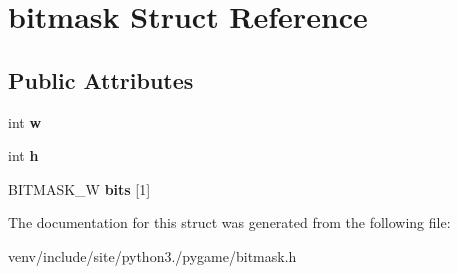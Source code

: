 \hypertarget{structbitmask}{}\section{bitmask Struct Reference}
\label{structbitmask}
\subsection*{Public Attributes}
\begin{DoxyCompactItemize}
\item 
\mbox{\label{structbitmask_a03e8844824a2221488952b5d8cb36fbc}} 
int {\bfseries w}
\item 
\mbox{\label{structbitmask_a381e9181479b66c7eddd1a2fb6c2f54c}} 
int {\bfseries h}
\item 
\mbox{\label{structbitmask_a0f7afba30822975fc0d090e89254d1fe}} 
B\+I\+T\+M\+A\+S\+K\+\_\+W {\bfseries bits} \mbox{[}1\mbox{]}
\end{DoxyCompactItemize}


The documentation for this struct was generated from the following file\+:\begin{DoxyCompactItemize}
\item 
venv/include/site/python3./pygame/bitmask.\+h\end{DoxyCompactItemize}
